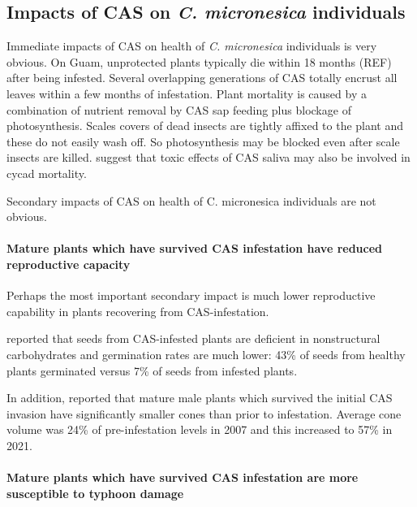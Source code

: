 \documentclass[12pt,letterpaper,english,bibliography=totocnumbered, abstract=on]{scrartcl}
\begin{document}

\subsection{Impacts of CAS on \textit{C. micronesica} individuals}

Immediate impacts of CAS on health of \textit{C. micronesica} individuals is very obvious. On Guam, unprotected plants typically die within 18 months (REF) after being infested. Several overlapping generations of CAS totally encrust all leaves within a few months of infestation. Plant mortality is caused by a combination of nutrient removal by CAS sap feeding plus blockage of photosynthesis. Scales covers of dead insects are tightly affixed to the plant and these do not easily wash off. So photosynthesis may be blocked even after scale insects are killed. \cite{muniappanCycadAulacaspisScale2012} suggest that toxic effects of CAS saliva may also be involved in cycad mortality. 


Secondary impacts of CAS on health of C. micronesica individuals are not obvious.

\paragraph{Mature plants which have survived CAS infestation have reduced reproductive capacity}

Perhaps the most important secondary impact is much lower reproductive capability in plants recovering from CAS-infestation.  

\cite{marlerSourceSinkRelations2019} reported that seeds from CAS-infested plants are deficient in nonstructural carbohydrates  and germination rates are much lower: 43\% of seeds from healthy plants germinated versus 7\% of seeds from infested plants.

In addition, \cite{marlerAulacaspisYasumatsuiInvasion2021} reported that mature male plants which survived the initial CAS invasion have significantly smaller cones than prior to infestation. Average cone volume was 24\% of pre-infestation levels in 2007 and this increased to 57\% in 2021.

\paragraph{Mature plants which have survived CAS infestation are more susceptible to typhoon damage}  
\end{document}
